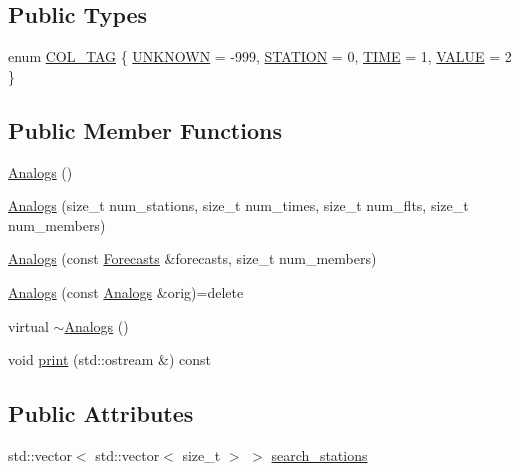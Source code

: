 \subsection*{Public Types}
\begin{DoxyCompactItemize}
\item 
enum \mbox{\hyperlink{class_analogs_a9b56dcdb212f44c3ba40a60736d648bb}{C\+O\+L\+\_\+\+T\+AG}} \{ \mbox{\hyperlink{class_analogs_a9b56dcdb212f44c3ba40a60736d648bba5a08d0e60f9a619e16546d744854c670}{U\+N\+K\+N\+O\+WN}} = -\/999, 
\mbox{\hyperlink{class_analogs_a9b56dcdb212f44c3ba40a60736d648bbad9315e6d921f3bc928effd909dd0d67b}{S\+T\+A\+T\+I\+ON}} = 0, 
\mbox{\hyperlink{class_analogs_a9b56dcdb212f44c3ba40a60736d648bba64d8ac114131a39195bc644f3fb0f084}{T\+I\+ME}} = 1, 
\mbox{\hyperlink{class_analogs_a9b56dcdb212f44c3ba40a60736d648bba28a85fd8dc593df26ed8d479a2745051}{V\+A\+L\+UE}} = 2
 \}
\end{DoxyCompactItemize}
\subsection*{Public Member Functions}
\begin{DoxyCompactItemize}
\item 
\mbox{\hyperlink{class_analogs_a8234aca0bc007305113d41b3e9f44a30}{Analogs}} ()
\item 
\mbox{\hyperlink{class_analogs_ab8fda7c92e8685f0be660ecdf7bf32a3}{Analogs}} (size\+\_\+t num\+\_\+stations, size\+\_\+t num\+\_\+times, size\+\_\+t num\+\_\+flts, size\+\_\+t num\+\_\+members)
\item 
\mbox{\hyperlink{class_analogs_a8e13e48e4097462f1ff324fa62c6481c}{Analogs}} (const \mbox{\hyperlink{class_forecasts}{Forecasts}} \&forecasts, size\+\_\+t num\+\_\+members)
\item 
\mbox{\hyperlink{class_analogs_af4174aafbd1d9d21cc4ea9ee3ab62dfd}{Analogs}} (const \mbox{\hyperlink{class_analogs}{Analogs}} \&orig)=delete
\item 
virtual \mbox{\hyperlink{class_analogs_ae6de501f002f0a3c878d44d5c7b67a0d}{$\sim$\+Analogs}} ()
\item 
void \mbox{\hyperlink{class_analogs_a8ed3949305fc98471e987ae03c305c17}{print}} (std\+::ostream \&) const
\end{DoxyCompactItemize}
\subsection*{Public Attributes}
\begin{DoxyCompactItemize}
\item 
std\+::vector$<$ std\+::vector$<$ size\+\_\+t $>$ $>$ \mbox{\hyperlink{class_analogs_a32cff6e74cb1c15dc7fd769ab9835bca}{search\+\_\+stations}}
\end{DoxyCompactItemize}

